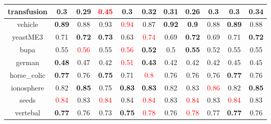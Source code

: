 \documentclass{article}%
\begin{document}
\begin{tabular}{c|cccccccccc}
\hline%
transfusion&\textbf{0.3}&0.29&\textcolor{red}{ 
0.45
}&0.3&\textbf{0.32}&0.31&0.26&\textbf{0.3}&0.3&\textbf{0.34}\\%
\hline%
vehicle&\textbf{0.89}&0.88&0.93&\textcolor{red}{ 
0.94
}&0.87&\textbf{0.92}&\textbf{0.9}&0.88&\textbf{0.89}&0.88\\%
\hline%
yeastME3&0.71&\textbf{0.72}&\textbf{0.73}&0.63&\textcolor{red}{ 
0.74
}&0.69&\textbf{0.72}&0.69&0.71&\textbf{0.72}\\%
\hline%
bupa&0.55&\textcolor{red}{ 
0.56
}&0.55&\textcolor{red}{ 
0.56
}&\textbf{0.52}&0.5&\textbf{0.55}&0.52&0.55&0.55\\%
\hline%
german&\textbf{0.48}&0.47&0.42&\textcolor{red}{ 
0.51
}&\textbf{0.43}&0.42&0.42&0.42&0.45&0.45\\%
\hline%
horse\_colic&\textbf{0.77}&0.76&\textbf{0.75}&0.71&\textcolor{red}{ 
0.8
}&0.76&0.76&0.76&\textbf{0.77}&0.76\\%
\hline%
ionosphere&0.82&\textbf{0.85}&0.75&\textbf{0.83}&\textbf{0.83}&0.82&0.83&\textcolor{red}{ 
0.86
}&0.82&\textbf{0.85}\\%
\hline%
seeds&\textcolor{red}{ 
0.84
}&0.83&\textcolor{red}{ 
0.84
}&0.84&\textcolor{red}{ 
0.84
}&0.83&\textcolor{red}{ 
0.84
}&0.83&\textcolor{red}{ 
0.84
}&0.83\\%
\hline%
vertebal&\textbf{0.77}&0.76&0.73&\textbf{0.75}&\textcolor{red}{ 
0.78
}&0.76&\textcolor{red}{ 
0.78
}&0.77&\textbf{0.77}&0.76\\%
\hline%
\end{tabular}

%
\end{document}
